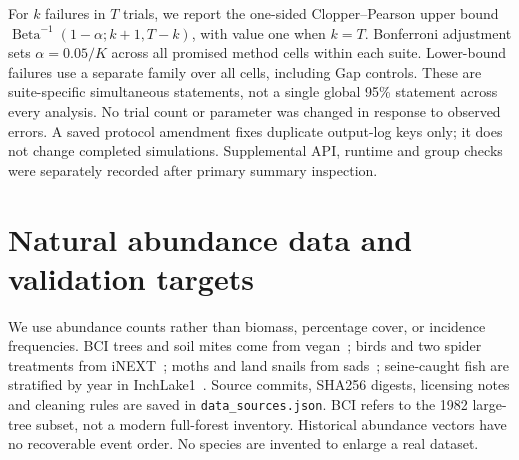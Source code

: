For $k$ failures in $T$ trials, we report the one-sided Clopper--Pearson upper bound $\operatorname{Beta}^{-1}(1-\alpha;k+1,T-k)$, with value one when $k=T$. Bonferroni adjustment sets $\alpha=0.05/K$ across all promised method cells within each suite. Lower-bound failures use a separate family over all cells, including Gap controls. These are suite-specific simultaneous statements, not a single global 95\% statement across every analysis. No trial count or parameter was changed in response to observed errors. A saved protocol amendment fixes duplicate output-log keys only; it does not change completed simulations. Supplemental API, runtime and group checks were separately recorded after primary summary inspection.

\section{Natural abundance data and validation targets}

We use abundance counts rather than biomass, percentage cover, or incidence frequencies. BCI trees and soil mites come from vegan~\cite{vegan}; birds and two spider treatments from iNEXT~\cite{inext}; moths and land snails from sads~\cite{sads}; seine-caught fish are stratified by year in InchLake1~\cite{fish}. Source commits, SHA256 digests, licensing notes and cleaning rules are saved in \texttt{data\_sources.json}. BCI refers to the 1982 large-tree subset, not a modern full-forest inventory. Historical abundance vectors have no recoverable event order. No species are invented to enlarge a real dataset.

